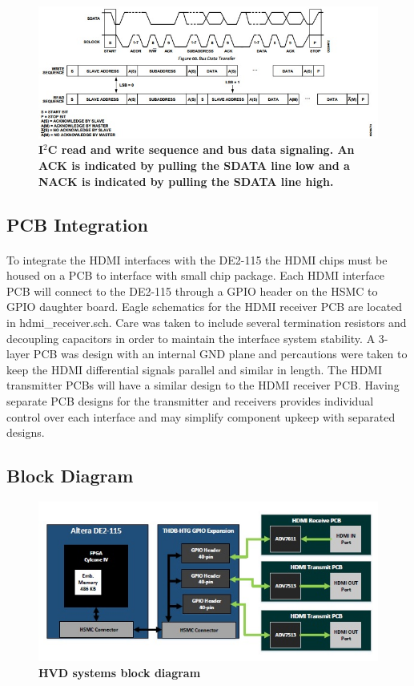 \documentclass[pdftex,12pt,a4paper]{article}
\begin{document}
\begin{figure}[H]
\centering
\includegraphics[width=\textwidth]{i2c_rw.jpg}
\caption{\textbf{I$^2$C read and write sequence and bus data signaling. An ACK is indicated by pulling the SDATA line low and a NACK is indicated by pulling the SDATA line high.}}
\label{fig:i2c}
\end{figure}

\subsection{PCB Integration}

\paragraph{}
To integrate the HDMI interfaces with the DE2-115 the HDMI chips must be housed on a PCB to interface with small chip package. Each HDMI interface PCB will connect to the DE2-115 through a GPIO header on the HSMC to GPIO daughter board. Eagle schematics for the HDMI receiver PCB are located in hdmi\_receiver.sch. Care was taken to include several termination resistors and decoupling capacitors in order to maintain the interface system stability. A 3-layer PCB was design with an internal GND plane and percautions were taken to keep the HDMI differential signals parallel and similar in length. The HDMI transmitter PCBs will have a similar design to the HDMI receiver PCB. Having separate PCB designs for the transmitter and receivers provides individual control over each interface and may simplify component upkeep with separated designs.

\subsection{Block Diagram}

\begin{figure}[H]
\centering
\includegraphics{BlockDiagram.jpg}
\caption{\textbf{HVD systems block diagram}}
\label{fig:block}
\end{figure}
\end{document}
